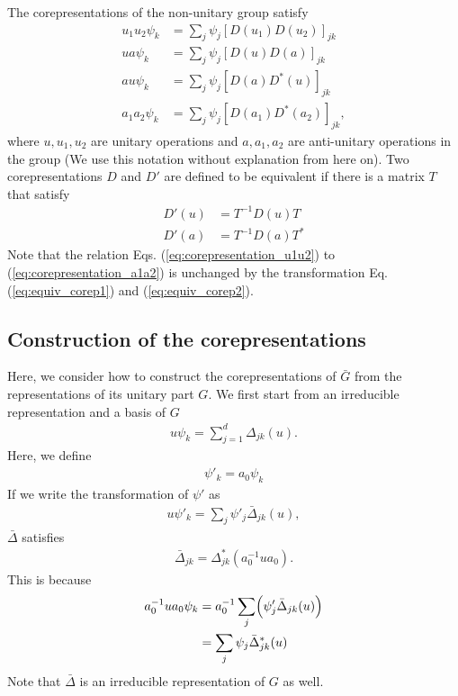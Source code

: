 \documentclass{article}
\begin{document}
The corepresentations of the non-unitary group satisfy
\begin{align}
  u_1 u_2 \psi_k &= \sum_j \psi_j [D(u_1) D(u_2)]_{jk}
  \label{eq:corepresentation_u1u2}
  \\
  u a \psi_k &= \sum_j \psi_j [D(u) D(a)]_{jk}
  \label{eq:corepresentation_ua}
  \\
  au \psi_k &= \sum_j \psi_j [D(a) D^*(u)]_{jk}
  \label{eq:corepresentation_au}
  \\
  a_1 a_2 \psi_k &= \sum_j \psi_j [D(a_1) D^*(a_2)]_{jk},
  \label{eq:corepresentation_a1a2}
\end{align}
where $u, u_1, u_2$ are unitary operations and $a, a_1, a_2$ are anti-unitary operations in the group (We use this notation without explanation from here on).
Two corepresentations $D$ and $D'$ are defined to be equivalent if there is a matrix $T$ that satisfy
\begin{align}
  D'(u) &= T^{-1} D(u) T
  \label{eq:equiv_corep1}
  \\
  D'(a) &= T^{-1} D(a) T^*
  \label{eq:equiv_corep2}
\end{align}
Note that the relation Eqs. (\ref{eq:corepresentation_u1u2}) to (\ref{eq:corepresentation_a1a2}) is unchanged by the transformation Eq. (\ref{eq:equiv_corep1}) and (\ref{eq:equiv_corep2}).

\subsection{Construction of the corepresentations}
Here, we consider how to construct the corepresentations of $\bar{G}$ from the representations of its unitary part $G$.
We first start from an irreducible representation and a basis of $G$
\begin{align}
  u \psi_k = \sum_{j = 1}^d \Delta_{jk}(u).
\end{align}
Here, we define 
\begin{align}
  \psi'_k = a_0 \psi_k
\end{align}
If we write the transformation of $\psi'$ as
\begin{align}
  u \psi'_k = \sum_j \psi'_j \bar{\Delta}_{jk}(u),
\end{align}
$\bar{\Delta}$ satisfies
\begin{align}
  \bar{\Delta}_{jk} = \Delta^*_{jk} (a_0^{-1} u a_0).
\end{align}
This is because
\begin{align}
  a_0^{-1} u a_0 \psi_k 
  &= 
  a_0^{-1}
  \sum_j
  \Bigl(
    \psi'_j \bar{\Delta}_{jk}(u)  
  \Bigr)
  \nonumber
  \\&=
  \sum_j \psi_j \bar{\Delta}^*_{jk}(u)  
\end{align}
Note that $\bar{\Delta}$ is an irreducible representation of $G$ as well.
\end{document}
